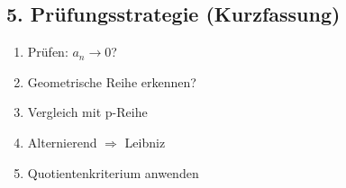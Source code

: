     \subsection*{5. Prüfungsstrategie (Kurzfassung)}
    
    \begin{enumerate}
        \item Prüfen: $a_n \to 0$?
        \item Geometrische Reihe erkennen?
        \item Vergleich mit p-Reihe
        \item Alternierend $\Rightarrow$ Leibniz
        \item Quotientenkriterium anwenden
    \end{enumerate}
